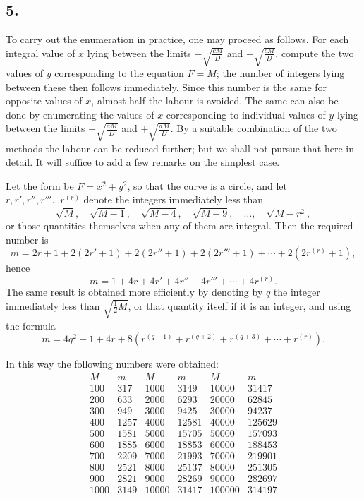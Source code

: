 \documentclass[12pt]{article}
\begin{document}
\subsection*{5.}

To carry out the enumeration in practice, one may proceed as follows. For each integral value of $x$ lying between the limits $-\sqrt{\frac{cM}{D}}$ and $+\sqrt{\frac{cM}{D}}$, compute the two values of $y$ corresponding to the equation $F=M$; the number of integers lying between these then follows immediately. Since this number is the same for opposite values of $x$, almost half the labour is avoided. The same can also be done by enumerating the values of $x$ corresponding to individual values of $y$ lying between the limits $-\sqrt{\frac{aM}{D}}$ and $+\sqrt{\frac{aM}{D}}$. By a suitable combination of the two methods the labour can be reduced further; but we shall not pursue that here in detail. It will suffice to add a few remarks on the simplest case.

Let the form be $F=x^2+y^2$, so that the curve is a circle, and let $r,r',r'',r'''\ldots r^{(r)}$ denote the integers immediately less than
\[
\sqrt M,\quad \sqrt{M-1},\quad \sqrt{M-4},\quad \sqrt{M-9},\quad \ldots,\quad \sqrt{M-r^2},
\]
or those quantities themselves when any of them are integral. Then the required number is
\[
m=2r+1+2(2r'+1)+2(2r''+1)+2(2r'''+1)+\cdots+2(2r^{(r)}+1),
\]
hence
\[
m=1+4r+4r'+4r''+4r'''+\cdots+4r^{(r)}.
\]
The same result is obtained more efficiently by denoting by $q$ the integer immediately less than $\sqrt{\frac12 M}$, or that quantity itself if it is an integer, and using the formula
\[
m=4q^2+1+4r+8\left(r^{(q+1)}+r^{(q+2)}+r^{(q+3)}+\cdots+r^{(r)}\right).
\]

In this way the following numbers were obtained:
\[
\begin{array}{rr|rr|rr}
M&m&M&m&M&m\\
100&317&1000&3149&10000&31417\\
200&633&2000&6293&20000&62845\\
300&949&3000&9425&30000&94237\\
400&1257&4000&12581&40000&125629\\
500&1581&5000&15705&50000&157093\\
600&1885&6000&18853&60000&188453\\
700&2209&7000&21993&70000&219901\\
800&2521&8000&25137&80000&251305\\
900&2821&9000&28269&90000&282697\\
1000&3149&10000&31417&100000&314197
\end{array}
\]
\end{document}

